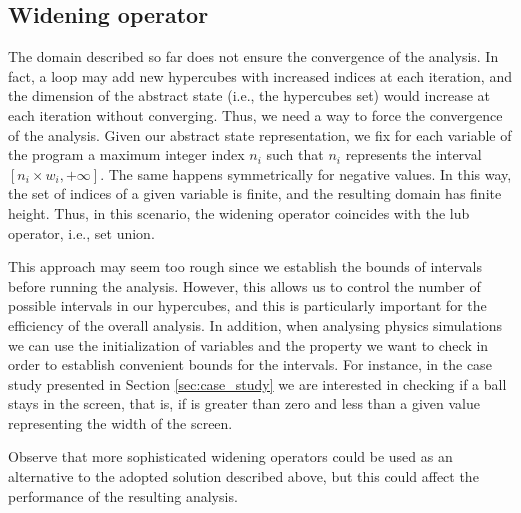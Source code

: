 \subsection{Widening operator}
The domain described so far does not ensure the convergence of the analysis. In fact, a  loop may add new hypercubes with increased indices at each iteration, and the dimension of the abstract state (i.e., the hypercubes set) would increase at each iteration without converging. Thus, we need a way to force the convergence of the analysis. Given our abstract state representation, we fix for each variable of the program a maximum integer index $n_i$ such that $n_i$ represents the interval $[n_i \times w_i, +\infty]$. The same happens symmetrically for negative values. In this way, the set of indices of a given variable is finite, and the resulting domain has finite height. Thus, in this scenario, the widening operator coincides with the lub operator, i.e., set union. 

This approach may seem too rough since we establish the bounds of intervals before running the analysis. However, this allows us to control the number of possible intervals in our hypercubes, and this is particularly important for the efficiency of the overall analysis. In addition, when analysing physics simulations we can use the initialization of variables and the property we want to check in order to establish convenient bounds for the intervals. For instance, in the case study presented in Section \ref{sec:case_study} we are interested in checking if a ball stays in the screen, that is, if  is greater than zero and less than a given value  representing the width of the screen.

Observe that more sophisticated widening operators could be used as an alternative to the adopted solution described above, but this could affect the performance of the resulting analysis.


